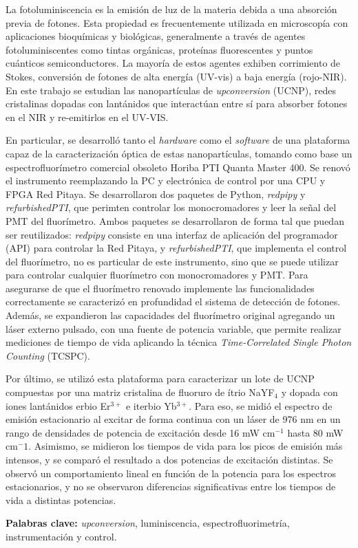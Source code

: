 
La fotoluminiscencia es la emisión de luz de la materia debida a una absorción previa de fotones. 
Esta propiedad es frecuentemente utilizada en microscopía con aplicaciones bioquímicas y biológicas, generalmente a través de agentes fotoluminiscentes como tintas orgánicas, proteínas fluorescentes y puntos cuánticos semiconductores. 
La mayoría de estos agentes exhiben corrimiento de Stokes, conversión de fotones de alta energía (UV-vis) a baja energía (rojo-NIR).
En este trabajo se estudian las nanopartículas de \textit{upconversion} (UCNP), redes cristalinas dopadas con lantánidos que interactúan entre sí para absorber fotones en el NIR y re-emitirlos en el UV-VIS.

En particular, se desarrolló tanto el \textit{hardware} como el \textit{software} de una plataforma capaz de la caracterización óptica de estas nanopartículas, tomando como base un espectrofluorímetro comercial obsoleto Horiba PTI Quanta Master 400.
Se renovó el instrumento reemplazando la PC y electrónica de control por una CPU y FPGA Red Pitaya.
Se desarrollaron dos paquetes de Python, \textit{redpipy} y \textit{refurbishedPTI}, que perimten controlar los monocromadores y leer la señal del PMT del fluorímetro.
Ambos paquetes se desarrollaron de forma tal que puedan ser reutilizados: \textit{redpipy} consiste en una interfaz de aplicación del programador (API) para controlar la Red Pitaya, y \textit{refurbishedPTI}, que implementa el control del fluorímetro, no es particular de este instrumento, sino que se puede utilizar para controlar cualquier fluorímetro con monocromadores y PMT.
Para asegurarse de que el fluorímetro renovado implemente las funcionalidades correctamente se caracterizó en profundidad el sistema de detección de fotones.
Además, se expandieron las capacidades del fluorímetro original agregando un láser externo pulsado, con una fuente de potencia variable, que permite realizar mediciones de tiempo de vida aplicando la técnica \textit{Time-Correlated Single Photon Counting} (TCSPC).

Por último, se utilizó esta plataforma para caracterizar un lote de UCNP compuestas por una matriz cristalina de fluoruro de ítrio NaYF$_4$ y dopada con iones lantánidos erbio Er$^{3+}$ e iterbio Yb$^{3+}$.
Para eso, se midió el espectro de emisión estacionario al excitar de forma continua con un láser de 976 nm en un rango de densidades de potencia de excitación desde 16 mW cm$^{-1}$ hasta 80 mW cm$^-1$.
Asimismo, se midieron los tiempos de vida para los picos de emisión más intensos, y se comparó el resultado a dos potencias de excitación distintas.
Se observó un comportamiento lineal en función de la potencia para los espectros estacionarios, y no se observaron diferencias significativas entre los tiempos de vida a distintas potencias.

\textbf{Palabras clave:} \textit{upconversion}, luminiscencia, espectrofluorimetría, instrumentación y control.




